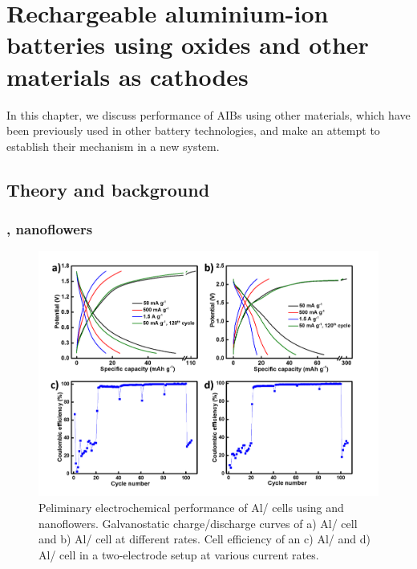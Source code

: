 
\chapter{Rechargeable aluminium-ion batteries using oxides and other materials as cathodes} %
In this chapter, we discuss performance of AIBs using other materials, which have been previously used in other battery technologies, and make an attempt to establish their mechanism in a new system.
\label{chap6} %


\newcommand{\keyword}[1]{\textbf{#1}}
\newcommand{\tabhead}[1]{\textbf{#1}}
\newcommand{\code}[1]{\texttt{#1}}
\newcommand{\file}[1]{\texttt{\bfseries#1}}
\newcommand{\option}[1]{\texttt{\itshape#1}}

\section{Theory and background}
\subsection*{, nanoflowers}
 \begin{figure}[tbh!]
  \centering
  \includegraphics[width=\textwidth]{Figures/chap6fig/MoX2YNCDCsCEs}
    \caption{Peliminary electrochemical performance of Al/ cells using  and  nanoflowers. Galvanostatic charge/discharge curves of a) Al/ cell and b) Al/ cell at different rates. Cell efficiency of an c) Al/ and d) Al/ cell in a two-electrode setup at various current rates.}
  \label{Figures/chap6fig:MoX2YNCDCsCEs}
\end{figure}

